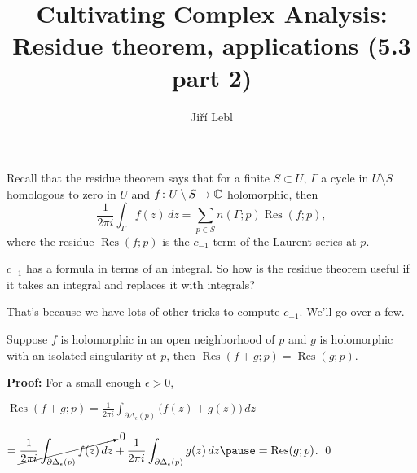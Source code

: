 \documentclass[10pt,aspectratio=169]{beamer}
\author{Ji\v{r}\'i Lebl}
\institute[OSU]{%
Departemento pri Matematiko de Oklahoma {\^S}tata Universitato}
\title{Cultivating Complex Analysis:\\%
Residue theorem, applications (5.3 part 2)}
\date{}
\begin{document}
\begin{frame}
\titlepage
\end{frame}

\begin{frame}
Recall that the residue theorem says that for a finite $S \subset U$,
$\Gamma$ a cycle in $U \setminus S$ homologous to zero in $U$
and $f \colon U \setminus S \to {\mathbb{C}}$ holomorphic, then
\[
\frac{1}{2\pi i} \int_{\Gamma} f(z) \, dz = \sum_{p \in S} n(\Gamma;p) \operatorname{Res}(f;p) ,
\]
where the residue $\operatorname{Res}(f;p)$ is the $c_{-1}$ term of the
Laurent series at $p$.

\medskip
\pause

$c_{-1}$ has a formula in terms of an integral.
\pause
So how is the residue theorem useful if it takes an integral and replaces
it with integrals?

\medskip
\pause

That's because we have lots of other tricks to compute $c_{-1}$.
We'll go over a few.

\end{frame}

\begin{frame}
\begin{proposition}
Suppose $f$ is holomorphic in an open neighborhood of $p$ and $g$ is holomorphic
with an isolated singularity at $p$, then
$\operatorname{Res}(f+g;p) = \operatorname{Res}(g;p)$.
\end{proposition}

\pause

\textbf{Proof:}
For a small enough $\epsilon > 0$,

\medskip
\quad
$\displaystyle
\operatorname{Res}(f+g;p)
=
\frac{1}{2\pi i}
\int_{\partial \Delta_{\epsilon}(p)}
\bigl(f(z)+g(z)\bigr) \, dz
$

\medskip
\pause

\hfill
\hfill
\hfill
$\displaystyle
=
\cancelto{0}{
\frac{1}{2\pi i}
\int_{\partial \Delta_{\epsilon}(p)}
f(z) \, dz
}
+
\frac{1}{2\pi i}
\int_{\partial \Delta_{\epsilon}(p)}
g(z) \, dz
\pause
=
\operatorname{Res}(g;p)$.
\qed
\end{frame}
\end{document}
